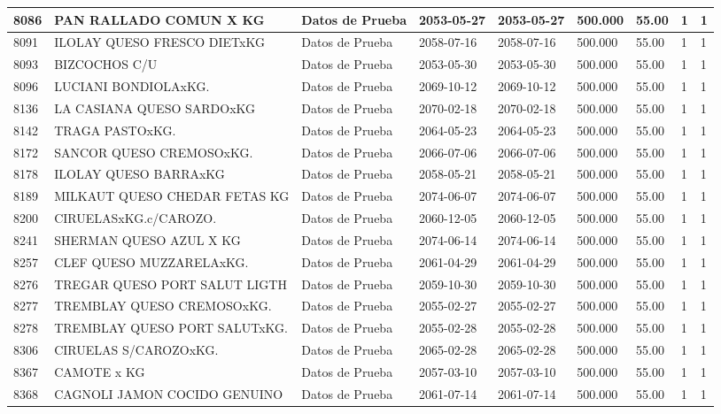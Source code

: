 \documentclass[a4paper,12pt]{article}
\begin{document}
\begin{landscape}
\begin{longtable}{|p{4cm}|p{2.5cm}|p{2.5cm}|p{1.8cm}|p{1.8cm}|p{1cm}|p{1cm}|p{3cm}|p{3cm}||}
8086 & PAN RALLADO COMUN X KG & Datos de Prueba & 2053-05-27 & 2053-05-27 & 500.000 & 55.00 & 1 & 1 \\ \hline 
8091 & ILOLAY QUESO FRESCO DIETxKG & Datos de Prueba & 2058-07-16 & 2058-07-16 & 500.000 & 55.00 & 1 & 1 \\ \hline 
8093 & BIZCOCHOS C/U & Datos de Prueba & 2053-05-30 & 2053-05-30 & 500.000 & 55.00 & 1 & 1 \\ \hline 
8096 & LUCIANI BONDIOLAxKG. & Datos de Prueba & 2069-10-12 & 2069-10-12 & 500.000 & 55.00 & 1 & 1 \\ \hline 
8136 & LA CASIANA QUESO SARDOxKG & Datos de Prueba & 2070-02-18 & 2070-02-18 & 500.000 & 55.00 & 1 & 1 \\ \hline 
8142 & TRAGA PASTOxKG. & Datos de Prueba & 2064-05-23 & 2064-05-23 & 500.000 & 55.00 & 1 & 1 \\ \hline 
8172 & SANCOR QUESO CREMOSOxKG. & Datos de Prueba & 2066-07-06 & 2066-07-06 & 500.000 & 55.00 & 1 & 1 \\ \hline 
8178 & ILOLAY QUESO BARRAxKG & Datos de Prueba & 2058-05-21 & 2058-05-21 & 500.000 & 55.00 & 1 & 1 \\ \hline 
8189 & MILKAUT QUESO CHEDAR FETAS KG & Datos de Prueba & 2074-06-07 & 2074-06-07 & 500.000 & 55.00 & 1 & 1 \\ \hline 
8200 & CIRUELASxKG.c/CAROZO. & Datos de Prueba & 2060-12-05 & 2060-12-05 & 500.000 & 55.00 & 1 & 1 \\ \hline 
8241 & SHERMAN QUESO AZUL X KG & Datos de Prueba & 2074-06-14 & 2074-06-14 & 500.000 & 55.00 & 1 & 1 \\ \hline 
8257 & CLEF QUESO MUZZARELAxKG. & Datos de Prueba & 2061-04-29 & 2061-04-29 & 500.000 & 55.00 & 1 & 1 \\ \hline 
8276 & TREGAR QUESO PORT SALUT LIGTH & Datos de Prueba & 2059-10-30 & 2059-10-30 & 500.000 & 55.00 & 1 & 1 \\ \hline 
8277 & TREMBLAY QUESO CREMOSOxKG. & Datos de Prueba & 2055-02-27 & 2055-02-27 & 500.000 & 55.00 & 1 & 1 \\ \hline 
8278 & TREMBLAY QUESO PORT SALUTxKG. & Datos de Prueba & 2055-02-28 & 2055-02-28 & 500.000 & 55.00 & 1 & 1 \\ \hline 
8306 & CIRUELAS S/CAROZOxKG. & Datos de Prueba & 2065-02-28 & 2065-02-28 & 500.000 & 55.00 & 1 & 1 \\ \hline 
8367 & CAMOTE x KG & Datos de Prueba & 2057-03-10 & 2057-03-10 & 500.000 & 55.00 & 1 & 1 \\ \hline 
8368 & CAGNOLI JAMON COCIDO GENUINO & Datos de Prueba & 2061-07-14 & 2061-07-14 & 500.000 & 55.00 & 1 & 1 \\ \hline 

\end{longtable}
\end{landscape}
\end{document}
